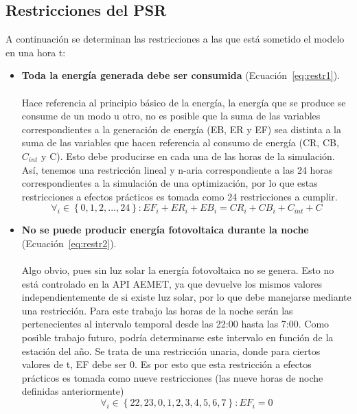 \subsection{Restricciones del PSR}
A continuación se determinan las restricciones a las que está sometido el modelo en una hora t:
\begin{itemize}
\item \textbf{Toda la energía generada debe ser consumida} (Ecuación~\ref{eq:restr1}).\\ \\Hace referencia al principio básico de la energía, la energía que se produce se consume de un modo u otro, no es posible que la suma de las variables correspondientes a la generación de energía (EB, ER y EF) sea distinta a la suma de las variables que hacen referencia al consumo de energía (CR, CB, $ C_{int} $ y C). Esto debe producirse en cada una de las horas de la simulación. Así, tenemos una restricción lineal y n-aria correspondiente a las 24 horas correspondientes a la simulación de una optimización, por lo que estas restricciones a efectos prácticos es tomada como 24 restricciones a cumplir.
\begin{equation}
        \label{eq:restr1}
        \forall_{i} \in \left\{ 0, 1, 2, ..., 24 \right\} : EF_{i}+ER_{i}+EB_{i} = CR_{i}+CB_{i}+C_{int}+C
\end{equation}

\item \textbf{No se puede producir energía fotovoltaica durante la noche} (Ecuación~\ref{eq:restr2}).\\ \\Algo obvio, pues sin luz solar la energía fotovoltaica no se genera. Esto no está controlado en la API AEMET, ya que devuelve los mismos valores independientemente de si existe luz solar, por lo que debe manejarse mediante una restricción. Para este trabajo las horas de la noche serán las pertenecientes al intervalo temporal desde las 22:00 hasta las 7:00. Como posible trabajo futuro, podría determinarse este intervalo en función de la estación del año. Se trata de una restricción unaria, donde para ciertos valores de t, EF debe ser 0. Es por esto que esta restricción a efectos prácticos es tomada como nueve restricciones (las nueve horas de noche definidas anteriormente)
\begin{equation}
        \label{eq:restr2}
       \forall_{i} \in \left\{ 22, 23, 0, 1, 2, 3, 4, 5, 6, 7 \right\} : EF_{i} = 0
\end{equation}


\end{itemize}
